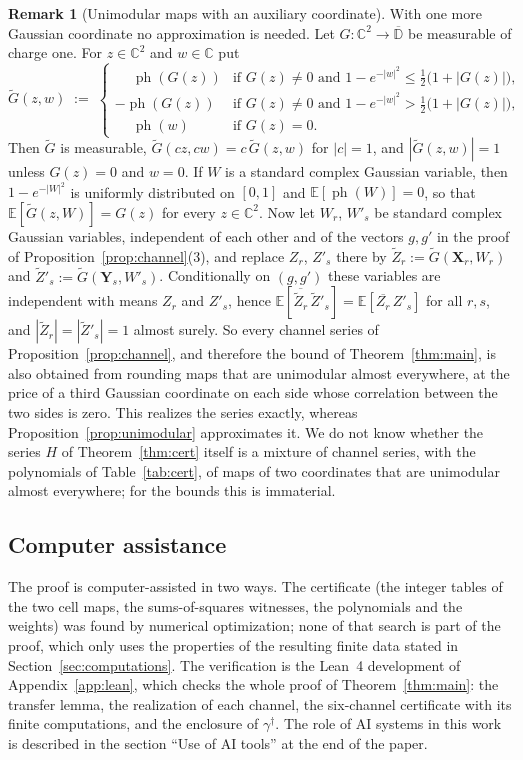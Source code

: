 \documentclass[11pt,reqno]{amsart}
\theoremstyle{definition}
\newtheorem{remark}[theorem]{Remark}
\numberwithin{equation}{section}
\newcommand{\C}{\mathbb{C}}
\newcommand{\D}{\mathbb{D}}
\newcommand{\E}{\mathbb{E}}
\newcommand{\gd}{\gamma^\dagger}
\newcommand{\ph}{\operatorname{ph}}
\begin{document}
\begin{remark}[Unimodular maps with an auxiliary coordinate]\label{rem:unimodular}
With one more Gaussian coordinate no approximation is needed. Let $G:\C^2\to\overline{\D}$ be measurable of charge one. For $z\in\C^2$ and $w\in\C$ put
\[
  \widetilde G(z,w)\;:=\;
  \begin{cases}
    \phantom{-}\ph(G(z)) & \text{if } G(z)\ne0 \text{ and } 1-e^{-|w|^2}\le\frac12\bigl(1+|G(z)|\bigr),\\[2pt]
    -\ph(G(z)) & \text{if } G(z)\ne0 \text{ and } 1-e^{-|w|^2}>\frac12\bigl(1+|G(z)|\bigr),\\[2pt]
    \phantom{-}\ph(w) & \text{if } G(z)=0 .
  \end{cases}
\]
Then $\widetilde G$ is measurable, $\widetilde G(cz,cw)=c\,\widetilde G(z,w)$ for $|c|=1$, and $|\widetilde G(z,w)|=1$ unless $G(z)=0$ and $w=0$. If $W$ is a standard complex Gaussian variable, then $1-e^{-|W|^2}$ is uniformly distributed on $[0,1]$ and $\E[\ph(W)]=0$, so that $\E[\widetilde G(z,W)]=G(z)$ for every $z\in\C^2$. Now let $W_r$, $W'_s$ be standard complex Gaussian variables, independent of each other and of the vectors $g,g'$ in the proof of Proposition~\ref{prop:channel}(3), and replace $Z_r$, $Z'_s$ there by $\widetilde Z_r:=\widetilde G(\mathbf{X}_r,W_r)$ and $\widetilde Z'_s:=\widetilde G(\mathbf{Y}_s,W'_s)$. Conditionally on $(g,g')$ these variables are independent with means $Z_r$ and $Z'_s$, hence $\E[\overline{\widetilde Z_r}\,\widetilde Z'_s]=\E[\overline{Z_r}\,Z'_s]$ for all $r,s$, and $|\widetilde Z_r|=|\widetilde Z'_s|=1$ almost surely. So every channel series of Proposition~\ref{prop:channel}, and therefore the bound of Theorem~\ref{thm:main}, is also obtained from rounding maps that are unimodular almost everywhere, at the price of a third Gaussian coordinate on each side whose correlation between the two sides is zero. This realizes the series exactly, whereas Proposition~\ref{prop:unimodular} approximates it. We do not know whether the series $H$ of Theorem~\ref{thm:cert} itself is a mixture of channel series, with the polynomials of Table~\ref{tab:cert}, of maps of two coordinates that are unimodular almost everywhere; for the bounds this is immaterial.
\end{remark}

\subsection{Computer assistance}
The proof is computer-assisted in two ways. The certificate (the integer tables of the two cell maps, the sums-of-squares witnesses, the polynomials and the weights) was found by numerical optimization; none of that search is part of the proof, which only uses the properties of the resulting finite data stated in Section~\ref{sec:computations}. The verification is the Lean~4 development of Appendix~\ref{app:lean}, which checks the whole proof of Theorem~\ref{thm:main}: the transfer lemma, the realization of each channel, the six-channel certificate with its finite computations, and the enclosure of $\gd$. The role of AI systems in this work is described in the section ``Use of AI tools'' at the end of the paper.
\end{document}
